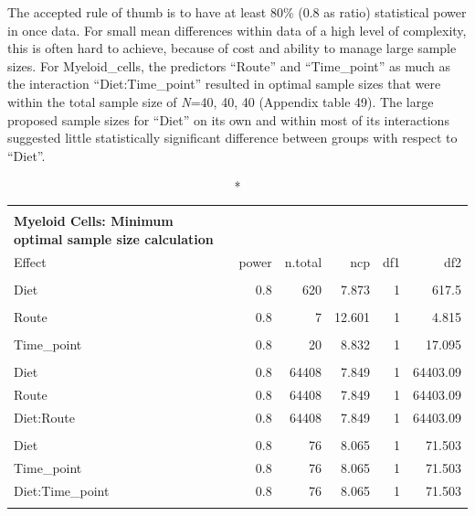 \documentclass[
  12pt,
  letterpaper,
]{article}
\begin{document}
The accepted rule of thumb is to have at least 80\% (0.8 as ratio) statistical power in once data. For small mean differences within data of a high level of complexity, this is often hard to achieve, because of cost and ability to manage large sample sizes. For Myeloid\_cells, the predictors ``Route'' and ``Time\_point'' as much as the interaction ``Diet:Time\_point'' resulted in optimal sample sizes that were within the total sample size of \emph{N}=40, 40, 40 (Appendix table 49). The large proposed sample sizes for ``Diet'' on its own and within most of its interactions suggested little statistically significant difference between groups with respect to ``Diet''.

\begin{longtable}{l|rrrrr}
\caption*{
{\large \textbf{Appendix Table 49}} \\ 
{\small \textbf{Myeloid Cells: Minimum optimal sample size calculation}}
} \\ 
\toprule
\multicolumn{1}{l}{Effect} & power & n.total & ncp & df1 & df2 \\ 
\midrule\addlinespace[2.5pt]
\multicolumn{6}{l}{Diet} \\ 
\midrule\addlinespace[2.5pt]
Diet & 0.8 & 620 & 7.873 & 1 & 617.5 \\ 
\midrule\addlinespace[2.5pt]
\multicolumn{6}{l}{Route} \\ 
\midrule\addlinespace[2.5pt]
Route & 0.8 & 7 & 12.601 & 1 & 4.815 \\ 
\midrule\addlinespace[2.5pt]
\multicolumn{6}{l}{Time\_point} \\ 
\midrule\addlinespace[2.5pt]
Time\_point & 0.8 & 20 & 8.832 & 1 & 17.095 \\ 
\midrule\addlinespace[2.5pt]
\multicolumn{6}{l}{Diet:Route} \\ 
\midrule\addlinespace[2.5pt]
Diet & 0.8 & 64408 & 7.849 & 1 & 64403.09 \\ 
Route & 0.8 & 64408 & 7.849 & 1 & 64403.09 \\ 
Diet:Route & 0.8 & 64408 & 7.849 & 1 & 64403.09 \\ 
\midrule\addlinespace[2.5pt]
\multicolumn{6}{l}{Diet:Time\_point} \\ 
\midrule\addlinespace[2.5pt]
Diet & 0.8 & 76 & 8.065 & 1 & 71.503 \\ 
Time\_point & 0.8 & 76 & 8.065 & 1 & 71.503 \\ 
Diet:Time\_point & 0.8 & 76 & 8.065 & 1 & 71.503 \\ 
\midrule\addlinespace[2.5pt]
\multicolumn{6}{l}{Route:Time\_point} \\ 

\end{longtable}
\end{document}
